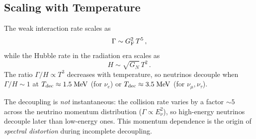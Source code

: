 \subsection{Scaling with Temperature}

The weak interaction rate scales as
\begin{equation}
\Gamma \sim G_{\rm F}^2\,T^5\,,
\end{equation}
while the Hubble rate in the radiation era scales as
\begin{equation}
H \sim \sqrt{G_N}\,T^2\,.
\end{equation}
The ratio $\Gamma/H \propto T^3$ decreases with temperature, so neutrinos decouple when $\Gamma/H \sim 1$ at $T_{\rm dec} \approx 1.5\;\mathrm{MeV}$ (for $\nu_e$) or $T_{\rm dec} \approx 3.5\;\mathrm{MeV}$ (for $\nu_\mu, \nu_\tau$).

The decoupling is \emph{not} instantaneous: the collision rate varies by a factor $\sim 5$ across the neutrino momentum distribution ($\Gamma \propto E_\nu^2$), so high-energy neutrinos decouple later than low-energy ones.  This momentum dependence is the origin of \emph{spectral distortion} during incomplete decoupling.

